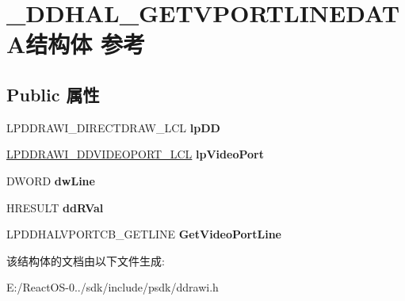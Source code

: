 \hypertarget{struct___d_d_h_a_l___g_e_t_v_p_o_r_t_l_i_n_e_d_a_t_a}{}\section{\+\_\+\+D\+D\+H\+A\+L\+\_\+\+G\+E\+T\+V\+P\+O\+R\+T\+L\+I\+N\+E\+D\+A\+T\+A结构体 参考}
\label{struct___d_d_h_a_l___g_e_t_v_p_o_r_t_l_i_n_e_d_a_t_a}
\subsection*{Public 属性}
\begin{DoxyCompactItemize}
\item 
\mbox{\label{struct___d_d_h_a_l___g_e_t_v_p_o_r_t_l_i_n_e_d_a_t_a_a722f88d766f4f1a87a7b3c0f243c2f89}} 
L\+P\+D\+D\+R\+A\+W\+I\+\_\+\+D\+I\+R\+E\+C\+T\+D\+R\+A\+W\+\_\+\+L\+CL {\bfseries lp\+DD}
\item 
\mbox{\label{struct___d_d_h_a_l___g_e_t_v_p_o_r_t_l_i_n_e_d_a_t_a_ac9b487e2ffaa9c6b9a245bd6c32f279a}} 
\hyperlink{struct___d_d_r_a_w_i___d_d_v_i_d_e_o_p_o_r_t___l_c_l}{L\+P\+D\+D\+R\+A\+W\+I\+\_\+\+D\+D\+V\+I\+D\+E\+O\+P\+O\+R\+T\+\_\+\+L\+CL} {\bfseries lp\+Video\+Port}
\item 
\mbox{\label{struct___d_d_h_a_l___g_e_t_v_p_o_r_t_l_i_n_e_d_a_t_a_a802265d896dd9def50eddf082a3bb4c3}} 
D\+W\+O\+RD {\bfseries dw\+Line}
\item 
\mbox{\label{struct___d_d_h_a_l___g_e_t_v_p_o_r_t_l_i_n_e_d_a_t_a_ab5bf4c395fc6971d33084a534bd7fae3}} 
H\+R\+E\+S\+U\+LT {\bfseries dd\+R\+Val}
\item 
\mbox{\label{struct___d_d_h_a_l___g_e_t_v_p_o_r_t_l_i_n_e_d_a_t_a_a5ae0f8cfa939393ce33bfde37e2958f7}} 
L\+P\+D\+D\+H\+A\+L\+V\+P\+O\+R\+T\+C\+B\+\_\+\+G\+E\+T\+L\+I\+NE {\bfseries Get\+Video\+Port\+Line}
\end{DoxyCompactItemize}


该结构体的文档由以下文件生成\+:\begin{DoxyCompactItemize}
\item 
E\+:/\+React\+O\+S-\/0../sdk/include/psdk/ddrawi.\+h\end{DoxyCompactItemize}
